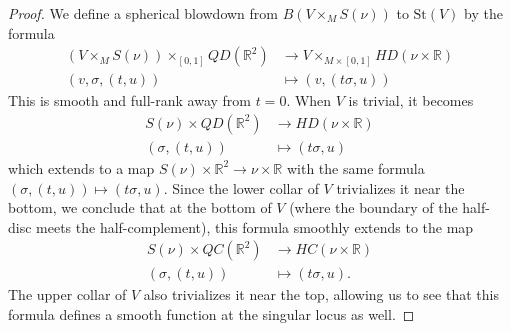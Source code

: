 \documentclass[11pt]{amsart}
\theoremstyle{definition}
\numberwithin{equation}{section}
\numberwithin{figure}{section}
\newcommand{\R}{\mathbb R}
\newcommand{\St}{\mathrm{St}}
\begin{document}
\begin{proof}

	We define a spherical blowdown from $B(V \times_M S(\nu))$ to $\St(V)$ by the formula
	\begin{align*}
		(V \times_M S(\nu)) \times_{[0,1]} QD(\R^2) &\to V \times_{M \times [0,1]} HD(\nu \times \R) \\
		(v,\sigma,(t,u)) &\mapsto (v,(t\sigma,u))
	\end{align*}
	This is smooth and full-rank away from $t = 0$. When $V$ is trivial, it becomes
	\begin{align*}
		S(\nu) \times QD(\R^2) &\to HD(\nu \times \R) \\
		(\sigma,(t,u)) &\mapsto (t\sigma,u)
	\end{align*}
	which extends to a map $S(\nu) \times \R^2 \to \nu \times \R$ with the same formula $(\sigma,(t,u)) \mapsto (t\sigma,u)$. Since the lower collar of $V$ trivializes it near the bottom, we conclude that at the bottom of $V$ (where the boundary of the half-disc meets the half-complement), this formula smoothly extends to the map
	\begin{align*}
		S(\nu) \times QC(\R^2) &\to HC(\nu \times \R) \\
		(\sigma,(t,u)) &\mapsto (t\sigma,u).
	\end{align*}
	The upper collar of $V$ also trivializes it near the top, allowing us to see that this formula defines a smooth function at the singular locus as well.
	

\end{proof}
\end{document}
